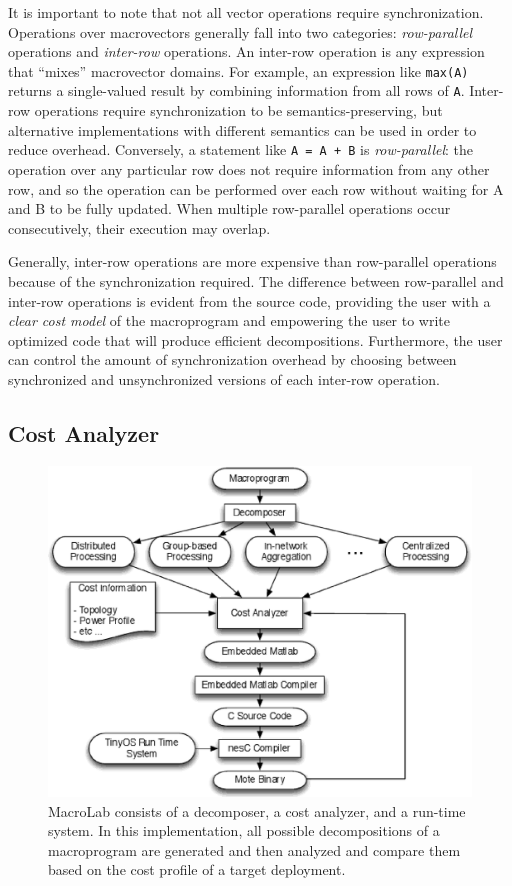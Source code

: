 It is important to note that not all vector operations require
synchronization.  Operations over macrovectors generally fall into two
categories: {\em row-parallel} operations and {\em inter-row}
operations.  An inter-row operation is any expression that ``mixes''
macrovector domains. For example, an expression like {\tt max(A)}
returns a single-valued result by combining information from all rows
of {\tt A}. Inter-row operations require synchronization to be
semantics-preserving, but alternative implementations with different
semantics can be used in order to reduce overhead.  Conversely, a
statement like {\tt A = A + B} is {\em row-parallel}: the operation
over any particular row does not require information from any other
row, and so the operation can be performed over each row without
waiting for A and B to be fully updated.  When multiple row-parallel
operations occur consecutively, their execution may overlap.

Generally, inter-row operations are more expensive than row-parallel
operations because of the synchronization required.  The difference
between row-parallel and inter-row operations is evident from the
source code, providing the user with a {\em clear cost model} of the
macroprogram and empowering the user to write optimized code
that will produce efficient decompositions.  Furthermore, the
user can control the amount of synchronization overhead by
choosing between synchronized and unsynchronized versions of each
inter-row operation.

\subsection{Cost Analyzer} \label{sect:costAnalyzer}

\begin{figure}[ht]
  \centering
  \includegraphics[width=0.8\columnwidth]{fig/System.eps}
  \caption[MacroLab system architecture]{MacroLab consists of a decomposer, a
  cost analyzer, and a run-time system. In this implementation, all possible
  decompositions of a macroprogram are generated and then analyzed and compare
  them based on the cost profile of a target deployment.}
  \label{fig:System}
\end{figure}

